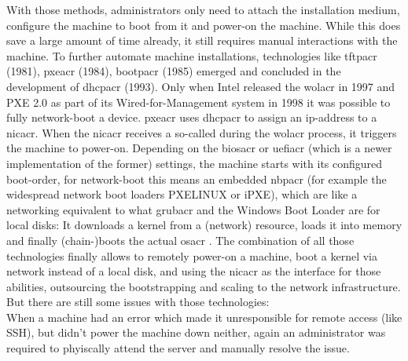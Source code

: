 \newline
With those methods, administrators only need to attach the installation medium, configure the machine to boot from it and power-on the machine. While this does save a large amount of time already, it still requires manual interactions with the machine.
\newline
To further automate machine installations, technologies like \gls{tftpacr} (1981), \gls{pxeacr} (1984), \gls{bootpacr} (1985) emerged and concluded in the development of \gls{dhcpacr} (1993). Only when Intel released the \gls{wolacr} in 1997 and PXE 2.0 as part of its Wired-for-Management system in 1998 it was possible to fully network-boot a device.
\newline
\Gls{pxeacr} uses \gls{dhcpacr} to assign an ip-address to a \gls{nicacr}. When the \gls{nicacr} receives a so-called  during the \gls{wolacr} process, it triggers the machine to power-on. Depending on the \gls{biosacr} or \gls{uefiacr} (which is a newer implementation of the former) settings, the machine starts with its configured boot-order, for network-boot this means an embedded \gls{nbpacr} (for example the widespread network boot loaders PXELINUX or iPXE), which are like a networking equivalent to what \gls{grubacr} and the Windows Boot Loader are for local disks: It downloads a kernel from a (network) resource, loads it into memory and finally (chain-)boots the actual \gls{osacr} \cite{preboot_execution_environment} \cite{understanding_bare_metal_service}.
\newline
The combination of all those technologies finally allows to remotely power-on a machine, boot a kernel via network instead of a local disk, and using the \gls{nicacr} as the interface for those abilities, outsourcing the bootstrapping and scaling to the network infrastructure.
\newline
But there are still some issues with those technologies: \\
When a machine had an error which made it unresponsible for remote access (like SSH), but didn't power the machine down neither, again an administrator was required to phyiscally attend the server and manually resolve the issue.
\newline
